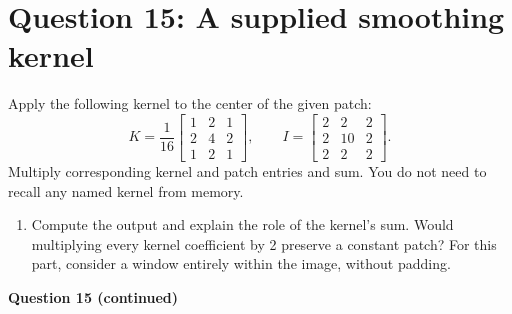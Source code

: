 \documentclass[11pt]{article}
\newenvironment{studentanswer}[1]
  {\par\medskip\noindent
   \begin{tcolorbox}[height from=#1 to 100cm, colback=white, colframe=gray!60,
     boxrule=0.6pt, arc=0pt, outer arc=0pt, left=7pt, right=7pt,
     top=7pt, bottom=7pt, title={Answer / work}, fonttitle=\small,
     coltitle=black, colbacktitle=gray!8, titlerule=0pt]
   \ignorespaces}
  {\end{tcolorbox}\par}
\begin{document}
\section*{Question 15: A supplied smoothing kernel}
Apply the following kernel to the center of the given patch:
\[
K=\frac1{16}\begin{bmatrix}1&2&1\\2&4&2\\1&2&1\end{bmatrix},
\qquad I=\begin{bmatrix}2&2&2\\2&10&2\\2&2&2\end{bmatrix}.
\]
Multiply corresponding kernel and patch entries and sum. You do not need
to recall any named kernel from memory.
\begin{enumerate}[label=(\alph*)]
\item \begin{minipage}[t]{\linewidth} Compute the output and explain the role of the kernel's sum.
Would multiplying every kernel coefficient by 2 preserve a constant patch?
For this part, consider a window entirely within the image, without padding.

\begin{studentanswer}{4cm}
\end{studentanswer}

\end{minipage}

\end{enumerate}
\clearpage
\noindent\textbf{Question 15 (continued)}
\end{document}
